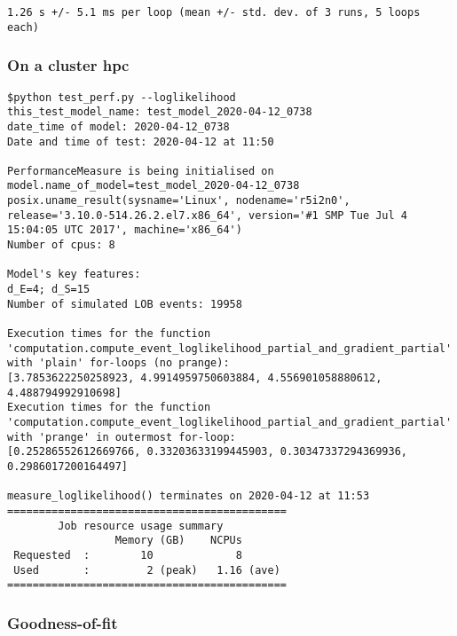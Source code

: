 \documentclass[10pt, article,table]{article}
\begin{document}
\begin{tcolorbox}[breakable, size=fbox, boxrule=.5pt, pad at break*=1mm, opacityfill=0]
\begin{Verbatim}[commandchars=\\\{\}, fontsize=\small]
1.26 s +/- 5.1 ms per loop (mean +/- std. dev. of 3 runs, 5 loops each)
    \end{Verbatim}
\end{tcolorbox}
\subsubsection*{On a cluster hpc}    
\begin{tcolorbox}[breakable, size=fbox, boxrule=1pt, pad at break*=1mm,colframe=cellborder]    
\begin{Verbatim}[commandchars=\\\{\}, fontsize=\small]
 $python test_perf.py --loglikelihood
this_test_model_name: test_model_2020-04-12_0738
date_time of model: 2020-04-12_0738
Date and time of test: 2020-04-12 at 11:50

PerformanceMeasure is being initialised on model.name_of_model=test_model_2020-04-12_0738
posix.uname_result(sysname='Linux', nodename='r5i2n0', release='3.10.0-514.26.2.el7.x86_64', version='#1 SMP Tue Jul 4 15:04:05 UTC 2017', machine='x86_64')
Number of cpus: 8

Model's key features:
d_E=4; d_S=15
Number of simulated LOB events: 19958

Execution times for the function 'computation.compute_event_loglikelihood_partial_and_gradient_partial' with 'plain' for-loops (no prange):
[3.7853622250258923, 4.9914959750603884, 4.556901058880612, 4.488794992910698]
Execution times for the function 'computation.compute_event_loglikelihood_partial_and_gradient_partial' with 'prange' in outermost for-loop:
[0.25286552612669766, 0.33203633199445903, 0.30347337294369936, 0.2986017200164497]

measure_loglikelihood() terminates on 2020-04-12 at 11:53
============================================
        Job resource usage summary 
                 Memory (GB)    NCPUs
 Requested  :        10             8
 Used       :         2 (peak)   1.16 (ave)
============================================
\end{Verbatim}
\end{tcolorbox}


\subsubsection{Goodness-of-fit}
\end{document}
